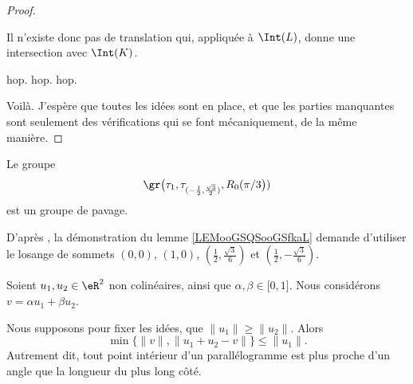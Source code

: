 \begin{proof}
\begin{subproof}
		Il n'existe donc pas de translation qui, appliquée à \( \Int(L)\), donne une intersection avec \( \Int(K)\).

		\spitem[Pour \( L=R_0(\pi/3)^3K\)]
		hop.
		\spitem[Pour \( L=R_0(\pi/3)^4K\)]
		hop.
		\spitem[Pour \( L=R_0(\pi/3)^5K\)]
		hop.
	\end{subproof}
	Voilà. J'espère que toutes les idées sont en place, et que les parties manquantes sont seulement des vérifications qui se font mécaniquement, de la même manière.
\end{proof}

\newcommand{\CaptionFigPWMCooGWYCczZn}{Illustrations pour le pavage du lemme \ref{LEMooMWWEooEbZXtb}.}


\begin{lemma}       \label{LEMooGSQSooGSfkaL}
	Le groupe
	\begin{equation}
		\gr\big(\tau_1,\tau_{(-\frac{ 1 }{2},\frac{ \sqrt{ 3 } }{2})},R_0(\pi/3\big))
	\end{equation}
	est un groupe de pavage.
\end{lemma}

D'après \cite{BIBooWIEGooJlwsCW}, la démonstration du lemme \ref{LEMooGSQSooGSfkaL} demande d'utiliser le losange de sommets \( (0,0)\), \( (1,0)\), \( (\frac{ 1 }{2},\frac{ \sqrt{ 3 } }{ 6 })\) et \( (\frac{ 1 }{2}, -\frac{  \sqrt{ 3 } }{ 6 })\).

\begin{lemma}        \label{LEMooEKWZooYbcGBp}
	Soient \( u_1,u_2\in \eR^2\) non colinéaires, ainsi que \( \alpha,\beta\in \mathopen[ 0 , 1 \mathclose]\). Nous considérons \( v=\alpha u_1+\beta u_2\).

	Nous supposons pour fixer les idées, que \( \| u_1 \|\geq \| u_2 \|\). Alors
	\begin{equation}
		\min\{ \| v \|, \| u_1+u_2-v \| \}\leq \| u_1 \|.
	\end{equation}
	Autrement dit, tout point intérieur d'un parallélogramme est plus proche d'un angle que la longueur du plus long côté.
\end{lemma}

